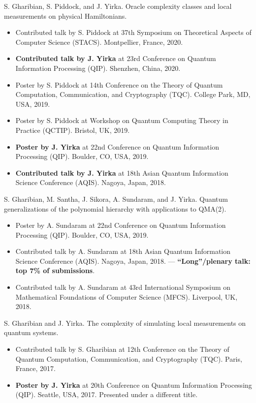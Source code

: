 \documentclass[11pt,letterpaper,serif]{moderncv}
\newcommand{\pubItemSep}{0.3em}
\begin{document}
S. Gharibian, S. Piddock, and J. Yirka. Oracle complexity classes and local measurements on physical Hamiltonians.
\begin{adjustwidth}{.25in}{}
	\begin{itemize}[itemsep=\pubItemSep]
		\item Contributed talk by S. Piddock at 37th Symposium on Theoretical Aspects of Computer Science (STACS). Montpellier, France, 2020.
		\item \textbf{Contributed talk by J. Yirka} at 23rd Conference on Quantum Information Processing (QIP). Shenzhen, China, 2020.
		\item Poster by S. Piddock at 14th Conference on the Theory of Quantum Computation, Communication, and Cryptography (TQC). College Park, MD, USA, 2019.
		\item Poster by S. Piddock at Workshop on Quantum Computing Theory in Practice (QCTIP). Bristol, UK, 2019.
		\item \textbf{Poster by J. Yirka} at 22nd Conference on Quantum Information Processing (QIP). Boulder, CO, USA, 2019.
		\item \textbf{Contributed talk by J. Yirka} at 18th Asian Quantum Information Science Conference (AQIS). Nagoya, Japan, 2018.
	\end{itemize}
\end{adjustwidth}

S. Gharibian, M. Santha, J. Sikora, A. Sundaram, and J. Yirka. Quantum generalizations of the polynomial hierarchy with applications to QMA(2).
\begin{adjustwidth}{.25in}{}
	\begin{itemize}[itemsep=\pubItemSep]
		\item Poster by A. Sundaram at 22nd Conference on Quantum Information Processing (QIP). Boulder, CO, USA, 2019.
		\item Contributed talk by A. Sundaram at 18th Asian Quantum Information Science Conference (AQIS). Nagoya, Japan, 2018. --- \textbf{``Long''/plenary talk: top 7\% of submissions}.
		\item Contributed talk by A. Sundaram at 43rd International	Symposium on Mathematical Foundations of Computer Science (MFCS). Liverpool, UK, 2018.
	\end{itemize}
\end{adjustwidth}

S. Gharibian and J. Yirka. The complexity of simulating local measurements on quantum systems.
\begin{adjustwidth}{.25in}{}
	\begin{itemize}[itemsep=\pubItemSep]
		\item Contributed talk by S. Gharibian at 12th Conference on the Theory of Quantum Computation, Communication,
		and Cryptography (TQC). Paris, France, 2017.
		\item \textbf{Poster by J. Yirka} at 20th Conference on Quantum Information Processing (QIP). Seattle, USA, 2017. Presented under a different title.
	\end{itemize}
\end{adjustwidth}
\end{document}
